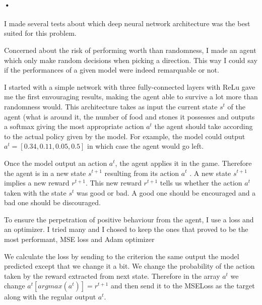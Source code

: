 \documentclass{article}
\begin{document}
\paragraph{•}
I made several tests about which deep neural network architecture was the best suited for this problem.\par
Concerned about the risk of performing worth than randomness, I made an agent which only make random decisions when picking a direction. This way I could say if the performances of a given model were indeed remarquable or not.\par
I started with a simple network with three fully-connected layers with ReLu gave me the first envouraging results, making the agent able to survive a lot more than randomness would. This architecture takes as input the current state $s^t$ of the agent (what is around it, the number of food and stones it possesses and outputs a softmax giving the most appropriate action $a^t$ the agent should take according to the actual policy given by the model. For example, the model could output $a^t = [0.34, 0.11, 0.05, 0.5]$ in which case the agent would go left.\par
Once the model output an action $a^t$, the agent applies it in the game. Therefore the agent is in a new state $s^{t + 1}$ resulting from its action $a^t$ . A new state $s^{t + 1}$ implies a new reward $r^{t + 1}$. This new reward $r^{t + 1}$ tells us whether the action $a^t$ taken with the state $s^t$ was good or bad. A good one should be encouraged and a bad one should be discouraged.\par
To ensure the perpetration of positive behaviour from the agent, I use a loss and an optimizer. I tried many and I chosed to keep the ones that proved to be the most performant, MSE loss and Adam optimizer\par
We calculate the loss by sending to the criterion the same output the model predicted except that we change it a bit. We change the probability of the action taken by the reward extracted from next state. Therefore in the array $a^t$ we change $a^t[argmax(a^t)] = r^{t+1}$ and then send it to the MSELoss as the target along with the regular output $a^t$.
\end{document}
